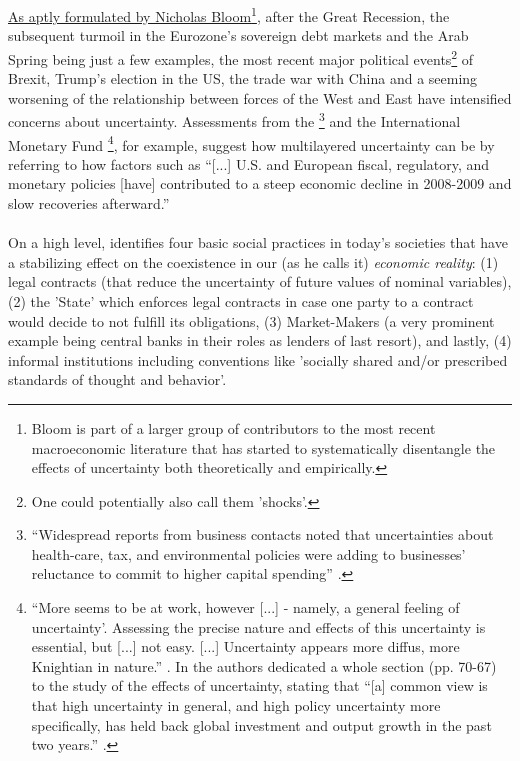 \documentclass[a4paper,11pt,listof=nochaptergap,oneside,pointednumbers,bibtotoc,bigheadings,liststotoc]{scrbook}
\theoremstyle{mysatz}
\theoremstyle{mydefinition}
\theoremstyle{mytheorem}
\theoremstyle{mybemerkung}
\begin{document}
\href{https://site.stanford.edu/2018/session-6}{As aptly formulated by Nicholas Bloom}\footnote{Bloom is part of a larger group of contributors to the most recent macroeconomic literature that has started to systematically disentangle the effects of uncertainty both theoretically and empirically.}, after the Great Recession, the subsequent turmoil in the Eurozone's sovereign debt markets and the Arab Spring being just a few examples, the most recent major political events\footnote{One could potentially also call them 'shocks'.} of Brexit, Trump's election in the US,  the trade war with China and a seeming worsening of the relationship between forces of the West and East have intensified concerns about uncertainty. Assessments from the 
\citet{FOMC:09}\footnote{``Widespread reports from business contacts noted that uncertainties about health-care, tax, and environmental policies were adding to businesses' reluctance to commit to higher capital spending'' \citep{FOMC:09}.} and the International Monetary Fund \citep{IMF:12, IMF:13}\footnote{``More seems to be at work, however [...] - namely, a general feeling of uncertainty'. Assessing the precise nature and effects of this uncertainty is essential, but [...] not easy. [...] Uncertainty appears more diffus, more Knightian in nature.'' \citep{IMF:12}. In \citet{IMF:13} the authors dedicated a whole section (pp. 70-67) to the study of the effects of uncertainty, stating that ``[a] common view is that high uncertainty in general, and high policy uncertainty more specifically, has held back global investment and output growth in the past two years.'' \citep[p. 70]{IMF:13}.}, for example, suggest how multilayered uncertainty can be by referring to how factors such as ``[...] U.S. and European fiscal, regulatory, and monetary policies [have] contributed to a steep economic decline in 2008-2009 and slow recoveries afterward.'' \citep[p.1594]{bakeretal:15}\\
\\
On a high level, \citet{dequesh:00} identifies four basic social practices in today's societies that have a stabilizing effect on the coexistence in our (as  he calls it) \textit{economic reality}: (1) legal contracts (that reduce the uncertainty of future values of nominal variables), (2) the 'State' which enforces legal contracts in case one party to a contract would decide to not fulfill its obligations, (3) Market-Makers (a very prominent example being central banks in their roles as lenders of last resort), and lastly, (4) informal institutions including conventions like 'socially shared and/or prescribed standards of thought and behavior'. \\
\end{document}
